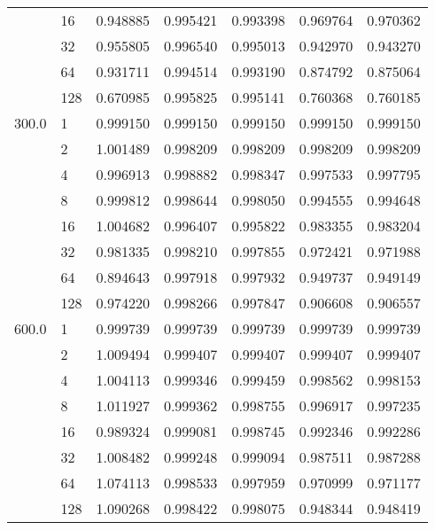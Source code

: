 \begin{tabular}{llrrrrr}
      & 16  &  0.948885 &  0.995421 &  0.993398 &  0.969764 &  0.970362 \\
      & 32  &  0.955805 &  0.996540 &  0.995013 &  0.942970 &  0.943270 \\
      & 64  &  0.931711 &  0.994514 &  0.993190 &  0.874792 &  0.875064 \\
      & 128 &  0.670985 &  0.995825 &  0.995141 &  0.760368 &  0.760185 \\
300.0 & 1   &  0.999150 &  0.999150 &  0.999150 &  0.999150 &  0.999150 \\
      & 2   &  1.001489 &  0.998209 &  0.998209 &  0.998209 &  0.998209 \\
      & 4   &  0.996913 &  0.998882 &  0.998347 &  0.997533 &  0.997795 \\
      & 8   &  0.999812 &  0.998644 &  0.998050 &  0.994555 &  0.994648 \\
      & 16  &  1.004682 &  0.996407 &  0.995822 &  0.983355 &  0.983204 \\
      & 32  &  0.981335 &  0.998210 &  0.997855 &  0.972421 &  0.971988 \\
      & 64  &  0.894643 &  0.997918 &  0.997932 &  0.949737 &  0.949149 \\
      & 128 &  0.974220 &  0.998266 &  0.997847 &  0.906608 &  0.906557 \\
600.0 & 1   &  0.999739 &  0.999739 &  0.999739 &  0.999739 &  0.999739 \\
      & 2   &  1.009494 &  0.999407 &  0.999407 &  0.999407 &  0.999407 \\
      & 4   &  1.004113 &  0.999346 &  0.999459 &  0.998562 &  0.998153 \\
      & 8   &  1.011927 &  0.999362 &  0.998755 &  0.996917 &  0.997235 \\
      & 16  &  0.989324 &  0.999081 &  0.998745 &  0.992346 &  0.992286 \\
      & 32  &  1.008482 &  0.999248 &  0.999094 &  0.987511 &  0.987288 \\
      & 64  &  1.074113 &  0.998533 &  0.997959 &  0.970999 &  0.971177 \\
      & 128 &  1.090268 &  0.998422 &  0.998075 &  0.948344 &  0.948419 \\
\bottomrule
\end{tabular}
